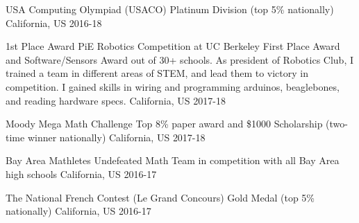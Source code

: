 



\begin{cvhonors}
  
  \cvhonor
    {USA Computing Olympiad (USACO)} %
    {Platinum Division (top 5\% nationally)}
    {California, US} %
    {2016-18} %
    
  \cvhonor
    {1st Place Award PiE Robotics Competition at UC Berkeley}  %
    {First Place Award and Software/Sensors Award out of 30+ schools. As president of Robotics Club, I trained a team in different areas of STEM, and lead them to victory in competition. I gained skills in wiring and programming arduinos, beaglebones, and reading hardware specs.}
    {California, US} %
    {2017-18} %

  \cvhonor
    {Moody Mega Math Challenge} %
    {Top 8\% paper award and \$1000 Scholarship (two-time winner nationally)}
    {California, US} %
    {2017-18} %
 
  \cvhonor
    {Bay Area Mathletes} %
    {Undefeated Math Team in competition with all Bay Area high schools}
    {California, US} %
    {2016-17} %

  \cvhonor
    {The National French Contest (Le Grand Concours)} %
    {Gold Medal (top 5\% nationally)}
    {California, US} %
    {2016-17} %
      
\end{cvhonors}
